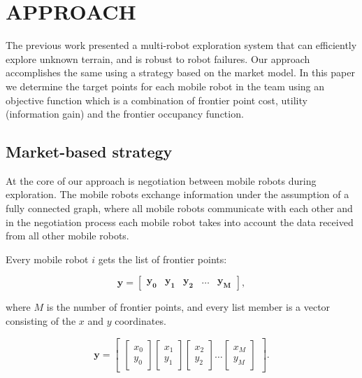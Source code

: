 \section{APPROACH}

The previous work presented a multi-robot exploration system that can efficiently explore unknown terrain, and is robust to robot failures. Our approach accomplishes the same using a strategy based on the market model. 
In this paper we determine the target points for each mobile robot in the team using an objective function which is a combination of frontier point cost, utility (information gain) and the frontier occupancy function. 

\subsection{Market-based strategy} 

At the core of our approach is negotiation between mobile robots during exploration. The mobile robots exchange information under the assumption of a fully connected graph, where all mobile robots communicate with each other and in the negotiation process each mobile robot takes into account the data received from all other mobile robots.

Every mobile robot $i$ gets the list of frontier points:

\begin{equation}
   \boldsymbol{y}=\begin{bmatrix}
    \boldsymbol{y_{0}} & \boldsymbol{y_{1}} & \boldsymbol{y_{2}} & \hdots & \boldsymbol{y_{M}}
\end{bmatrix},
\end{equation}

where $M$ is  the number of frontier points, and every list member is a vector consisting of the $x$ and $y$ coordinates. 

\begin{equation}
   \boldsymbol{y}=\begin{bmatrix}
   \begin{bmatrix}
           x_{0} \\
           y_{0} 
   \end{bmatrix}
    \begin{bmatrix}
         x_{1} \\
         y_{1} 
    \end{bmatrix}
    \begin{bmatrix}
         x_{2} \\
         y_{2} 
    \end{bmatrix}
    \hdots
    \begin{bmatrix}
         x_{M} \\
         y_{M} 
    \end{bmatrix}
\end{bmatrix}.
\end{equation}


